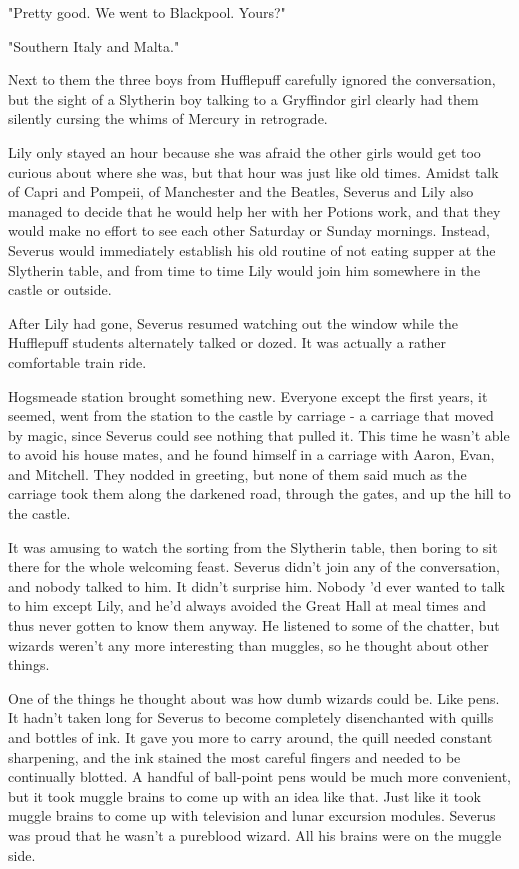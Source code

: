 \documentclass[a4paper,11pt]{article}
\begin{document}
"Pretty good. We went to Blackpool. Yours?"

"Southern Italy and Malta."

Next to them the three boys from Hufflepuff carefully ignored the conversation, but the sight of a Slytherin boy talking to a Gryffindor girl clearly had them silently cursing the whims of Mercury in retrograde.

Lily only stayed an hour because she was afraid the other girls would get too curious about where she was, but that hour was just like old times. Amidst talk of Capri and Pompeii, of Manchester and the Beatles, Severus and Lily also managed to decide that he would help her with her Potions work, and that they would make no effort to see each other Saturday or Sunday mornings. Instead, Severus would immediately establish his old routine of not eating supper at the Slytherin table, and from time to time Lily would join him somewhere in the castle or outside.

After Lily had gone, Severus resumed watching out the window while the Hufflepuff students alternately talked or dozed. It was actually a rather comfortable train ride.

Hogsmeade station brought something new. Everyone except the first years, it seemed, went from the station to the castle by carriage - a carriage that moved by magic, since Severus could see nothing that pulled it. This time he wasn't able to avoid his house mates, and he found himself in a carriage with Aaron, Evan, and Mitchell. They nodded in greeting, but none of them said much as the carriage took them along the darkened road, through the gates, and up the hill to the castle.

It was amusing to watch the sorting from the Slytherin table, then boring to sit there for the whole welcoming feast. Severus didn't join any of the conversation, and nobody talked to him. It didn't surprise him. Nobody 'd ever wanted to talk to him except Lily, and he'd always avoided the Great Hall at meal times and thus never gotten to know them anyway. He listened to some of the chatter, but wizards weren't any more interesting than muggles, so he thought about other things.

One of the things he thought about was how dumb wizards could be. Like pens. It hadn't taken long for Severus to become completely disenchanted with quills and bottles of ink. It gave you more to carry around, the quill needed constant sharpening, and the ink stained the most careful fingers and needed to be continually blotted. A handful of ball-point pens would be much more convenient, but it took muggle brains to come up with an idea like that. Just like it took muggle brains to come up with television and lunar excursion modules. Severus was proud that he wasn't a pureblood wizard. All his brains were on the muggle side.
\end{document}
